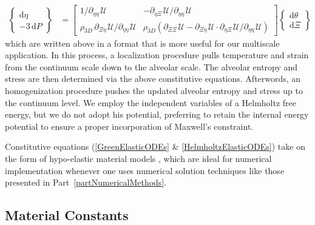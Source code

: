 \begin{subequations}
\begin{align}
    \left\{ \begin{matrix} \mathrm{d} \eta \\ 
    -3 \, \mathrm{d} P \end{matrix} \right\} & = \begin{bmatrix}
    1/\partial_{\eta\eta\,} \mathcal{U} & -\partial_{\eta \Xi\,} \mathcal{U} / \partial_{\eta\eta\,} \mathcal{U} \\
    \rho_{3D} \, \partial_{\Xi\eta\,} \mathcal{U} / \partial_{\eta\eta\,} \mathcal{U} & \rho_{3D} ( \partial_{\Xi\Xi\,} \mathcal{U} - \partial_{\Xi\eta\,} \mathcal{U} \!\cdot\! \partial_{\eta\Xi\,} \mathcal{U} / \partial_{\eta\eta\,} \mathcal{U} ) \end{bmatrix} \left\{ \begin{matrix} \mathrm{d} \theta \\
    \mathrm{d} \Xi \end{matrix} \right\}
    \end{align}
\end{subequations}
which are written above in a format that is more useful for our multi\-scale application.  In this process, a localization procedure pulls temperature and strain from the continuum scale down to the alveolar scale.  The alveolar entropy and stress are then determined via the above constitutive equations.  Afterwords, an homogenization procedure pushes the updated alveolar entropy and stress up to the continuum level.  We employ the independent variables of a Helmholtz free energy, but we do not adopt his potential, preferring to retain the internal energy potential to ensure a proper incorporation of Maxwell's constraint.  

Constitutive equations (\ref{GreenElasticODEs} \& \ref{HelmholtzElasticODEs}) take on the form of hypo-elastic material models \cite{Truesdell55}, which are ideal for numerical implementation whenever one uses numerical solution techniques like those presented in Part~\ref{partNumericalMethods}.

\subsection{Material Constants}

